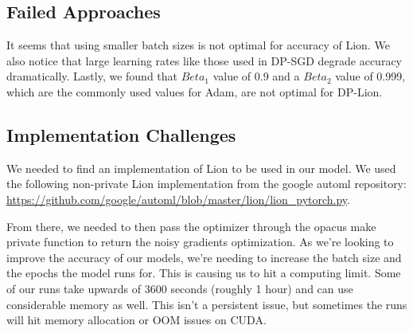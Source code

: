 \subsection{Failed Approaches}\label{subsec:failed-approaches2}
It seems that using smaller batch sizes is not optimal for accuracy of Lion. We also notice that large learning rates like those used in DP-SGD degrade accuracy dramatically. Lastly, 
we found that $Beta_{1}$ value of 0.9 and a $Beta_{2}$ value of 0.999, which are the commonly used values for Adam, are not optimal for DP-Lion.

\subsection{Implementation Challenges}\label{subsec:implementation-challenges2}
We needed to find an implementation of Lion to be used in our model. We used the following non-private Lion implementation from the google automl repository: 
\url{https://github.com/google/automl/blob/master/lion/lion_pytorch.py}. 

From there, we needed to then pass the optimizer through the opacus make private function to return the noisy gradients optimization.
As we're looking to improve the accuracy of our models, we're needing to increase the batch size and the epochs the model runs for. This is causing us to hit a computing
limit. Some of our runs take upwards of 3600 seconds (roughly 1 hour) and can use considerable memory as well. This isn't a persistent issue, but sometimes the runs will hit memory
allocation or OOM issues on CUDA.
